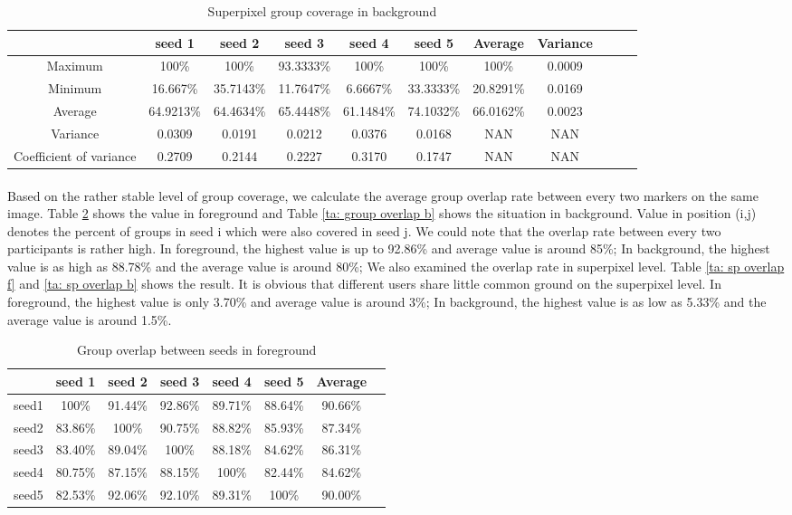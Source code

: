 \documentclass[runningheads,a4paper]{llncs}
\begin{document}
\begin{table}
\centering
\begin{tabular}{|c|c|c|c|c|c|c|c|c|c|c|}
\hline
 & seed 1 & seed 2&seed 3&seed 4&seed 5&Average&Variance \\
\hline
Maximum& 100\% & 100\% & 93.3333\%& 100\%& 100\%&100\%&0.0009\\
\hline
Minimum& 16.667\% & 35.7143\% & 11.7647\%& 6.6667\%& 33.3333\%&20.8291\%&0.0169\\
\hline
Average& 64.9213\% & 64.4634\% & 65.4448\%& 61.1484\%& 74.1032\%&66.0162\%&0.0023 \\
\hline
Variance& 0.0309 & 0.0191 & 0.0212& 0.0376& 0.0168&NAN&NAN \\
\hline
Coefficient of variance& 0.2709 & 0.2144 & 0.2227& 0.3170& 0.1747&NAN&NAN \\
\hline
\end{tabular}
\caption{Superpixel group coverage in background}
\label{ta: label coverage b}
\end{table} 


\paragraph{} Based on the rather stable level of group coverage, we calculate the average group overlap rate between every two markers on the same image. Table \ref{ta: group overlap f} shows the value in foreground and Table \ref{ta: group overlap b} shows the situation in background. Value in position (i,j) denotes the percent of groups in seed i which were also covered in seed j. We could note that the overlap rate between every two participants is rather high. In foreground, the highest value is up to 92.86\% and average value is around 85\%; In background, the highest value is as high as 88.78\% and the average value is around 80\%; We also examined the overlap rate in superpixel level. Table \ref{ta: sp overlap f} and \ref{ta: sp overlap b}  shows the result. It is obvious that different users share little common ground on the superpixel level. In foreground, the highest value is only 3.70\% and average value is around 3\%; In background, the highest value is as low as 5.33\% and the average value is around 1.5\%. 

\begin{table}
\centering
\begin{tabular}{|c|c|c|c|c|c|c|c|}
\hline
 & seed 1 & seed 2&seed 3&seed 4&seed 5&Average\\
\hline
seed1& 100\% & 91.44\% & 92.86\%& 89.71\%& 88.64\%&90.66\%\\
\hline
seed2& 83.86\% & 100\% & 90.75\%& 88.82\%& 85.93\%&87.34\%\\
\hline
seed3& 83.40\% & 89.04\% & 100\%& 88.18\%& 84.62\%&86.31\% \\
\hline
seed4& 80.75\% & 87.15\% & 88.15\%& 100\%& 82.44\%&84.62\% \\
\hline
seed5& 82.53\% & 92.06\% & 92.10\%& 89.31\%& 100\%&90.00\% \\
\hline
\end{tabular}
\caption{Group overlap between seeds in foreground }
\label{ta: group overlap f}
\end{table} 
\end{document}
